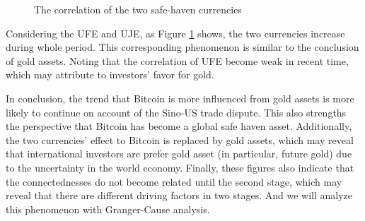 \documentclass[review]{elsarticle}
\begin{document}
\begin{figure}[H]
	\centering  %
	
	\caption{The correlation of the two safe-haven currencies}
	\label{Currency.main}
\end{figure}

Considering the UFE and UJE, as Figure \ref{Currency.main} shows, the two currencies increase during whole period. This corresponding phenomenon is similar to the conclusion of gold assets. Noting that the correlation of UFE become weak in recent time, which may attribute to investors' favor for gold.


In conclusion, the trend that Bitcoin is more influenced from gold assets is more likely to continue on account of the Sino-US trade dispute. This also strengths the perspective that Bitcoin has become a global safe haven asset. Additionally, the two currencies' effect to Bitcoin is replaced by gold assets, which may reveal that international investors are prefer gold asset (in particular, future gold) due to the uncertainty in the world economy. Finally, these figures also indicate that the connectednesses do not become related until the second stage, which may reveal that there are different driving factors in two stages. And we will analyze this phenomenon with Granger-Cause analysis. 
\end{document}
